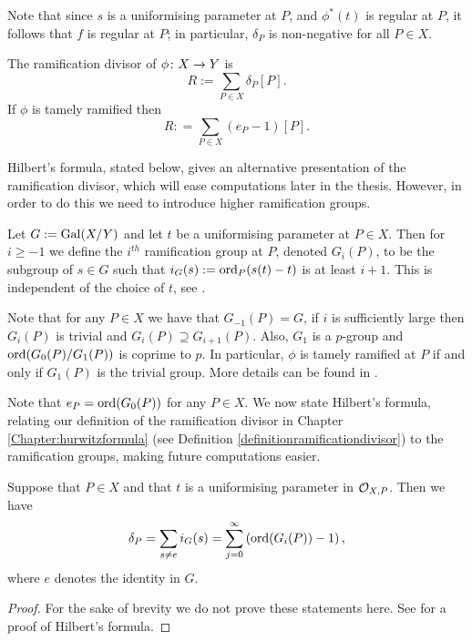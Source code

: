 Note that since $s$ is a uniformising parameter at $P$, and $\phi^*(t)$ is regular at $P$, it follows that $f$ is regular at $P$; in particular, $\delta_P$ is non-negative for all $P \in X$.
 
    \begin{defn}
    The ramification divisor of $\phi \colon X \rightarrow Y$ is 
        \[
        R:= \sum_{P \in X} \delta_P [P].
        \]
    If $\phi$ is tamely ramified then 
        \[
        R: = \sum_{P \in X} (e_P - 1)[P].
        \]
    \end{defn}

Hilbert's formula, stated below, gives an alternative presentation of the ramification divisor, which will ease computations later in the thesis.
However, in order to do this we need to introduce higher ramification groups.

   \begin{defn}
    Let $G:=\operatorname{Gal}(X/Y)$ and let $t$ be a uniformising parameter at $P\in X$.
    Then for $i\geq -1$ we define the $i^{th}$ ramification group at $P$, denoted $G_i(P)$, to be the subgroup of $s\in G$ such that $i_G(s) := \operatorname{ord}_P(s(t)-t)$ is at least $i+1$.
    This is	independent of the choice of $t$, see \cite[Chap. IV, \S 1, pg. 62]{localfields}.
    \end{defn}

Note that for any $P\in X$ we have that $G_{-1}(P)=G$, if $i$ is sufficiently large then $G_i(P)$ is trivial and $G_i(P)\supseteq G_{i+1}(P)$.
Also, $G_1$ is a $p$-group and $\operatorname{ord}(G_0(P)/G_1(P))$ is coprime to $p$.
In particular, $\phi$ is tamely ramified at $P$ if and only if $G_1(P)$ is the trivial group.
More details can be found in \cite[Chap. IV, \S 1]{localfields}.%

Note that $e_P = \operatorname{ord} (G_0(P))$ for any $P \in X$.
We now state Hilbert's formula, relating our definition of the ramification divisor in Chapter \ref{Chapter:hurwitzformula} (see Definition \ref{definitionramificationdivisor}) to the ramification groups, making future computations easier.


    \begin{thm}\label{hilbertsformula}
    Suppose that $P\in X$ and that $t$ is a uniformising parameter in ${\cal O}_{X,P}$.
    Then we have
        \begin{equation}
        \delta_P = \sum_{s\neq e}i_G(s)=\sum_{j=0}^{\infty}\left(\operatorname{ord}(G_i(P))-1\right),\label{ramdiv}
        \end{equation}
    where $e$ denotes the identity in $G$.
    \end{thm}
    \begin{proof}
    For the sake of brevity we do not prove these statements here. See \cite[Chap. IV, \S 1, Prop. 4]{localfields} for a proof of Hilbert's formula.
    \end{proof}

